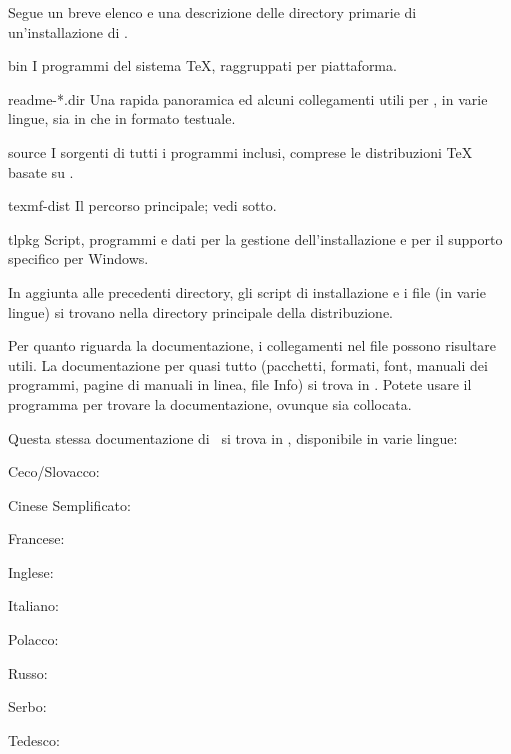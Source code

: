 \documentclass{article}
\begin{document}
Segue un breve elenco e una descrizione delle directory primarie di
un'installazione di \TL.

\begin{ttdescription}
\item[bin] I programmi del sistema \TeX{}, raggruppati per piattaforma.
%
\item[readme-*.dir] Una rapida panoramica ed alcuni collegamenti utili per 
  \TL{},
  in varie lingue, sia in \HTML{} che in formato testuale.
%
\item[source] I sorgenti di tutti i programmi inclusi, comprese le
  distribuzioni \TeX{} basate su \Webc{}.
%
\item[texmf-dist] Il percorso principale; vedi  sotto.
%
\item[tlpkg] Script, programmi e dati per la gestione
  dell'installazione e per il supporto specifico per Windows.
\end{ttdescription}

In aggiunta alle precedenti directory, gli script di installazione e i
file  (in varie lingue) si trovano nella directory 
principale della distribuzione.

Per quanto riguarda la documentazione, i collegamenti nel file
 possono risultare utili. La documentazione per quasi
tutto (pacchetti, formati, font, manuali dei programmi, 
pagine di manuali in linea, file Info)
si trova in . Potete usare il programma
 per trovare la documentazione, ovunque sia
collocata.

Questa stessa documentazione di \TL\ si trova in
, disponibile in varie lingue:

\begin{itemize*}
\item{Ceco/Slovacco:} 
\item{Cinese Semplificato:} 
\item{Francese:} 
\item{Inglese:} 
\item{Italiano:} 
\item{Polacco:} 
\item{Russo:} 
\item{Serbo:} 
\item{Tedesco:} 
\end{itemize*}
\end{document}
